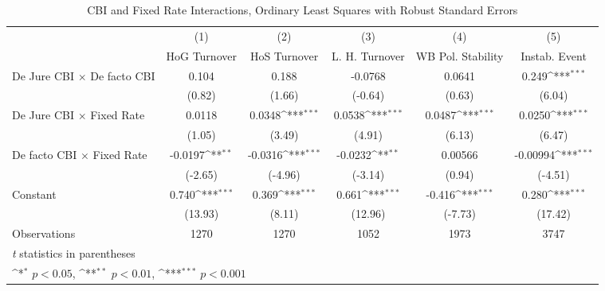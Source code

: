 \begin{table}[htbp]\centering
\def\sym#1{\ifmmode^{#1}\else\(^{#1}\)\fi}
\caption{CBI and Fixed Rate Interactions, Ordinary Least Squares with Robust Standard Errors \label{imultIndOLS}}
\begin{tabular}{l*{5}{c}}
\toprule
                                        &\multicolumn{1}{c}{(1)}&\multicolumn{1}{c}{(2)}&\multicolumn{1}{c}{(3)}&\multicolumn{1}{c}{(4)}&\multicolumn{1}{c}{(5)}\\
                                        &\multicolumn{1}{c}{HoG Turnover}&\multicolumn{1}{c}{HoS Turnover}&\multicolumn{1}{c}{L. H. Turnover}&\multicolumn{1}{c}{WB Pol. Stability}&\multicolumn{1}{c}{Instab. Event}\\
\midrule
De Jure CBI $\times$ De facto CBI       &    0.104         &    0.188         &  -0.0768         &   0.0641         &    0.249\sym{***}\\
                                        &   (0.82)         &   (1.66)         &  (-0.64)         &   (0.63)         &   (6.04)         \\
\addlinespace
De Jure CBI $\times$ Fixed Rate         &   0.0118         &   0.0348\sym{***}&   0.0538\sym{***}&   0.0487\sym{***}&   0.0250\sym{***}\\
                                        &   (1.05)         &   (3.49)         &   (4.91)         &   (6.13)         &   (6.47)         \\
\addlinespace
De facto CBI $\times$ Fixed Rate        &  -0.0197\sym{**} &  -0.0316\sym{***}&  -0.0232\sym{**} &  0.00566         & -0.00994\sym{***}\\
                                        &  (-2.65)         &  (-4.96)         &  (-3.14)         &   (0.94)         &  (-4.51)         \\
\addlinespace
Constant                                &    0.740\sym{***}&    0.369\sym{***}&    0.661\sym{***}&   -0.416\sym{***}&    0.280\sym{***}\\
                                        &  (13.93)         &   (8.11)         &  (12.96)         &  (-7.73)         &  (17.42)         \\
\midrule
Observations                            &     1270         &     1270         &     1052         &     1973         &     3747         \\
\bottomrule
\multicolumn{6}{l}{\footnotesize \textit{t} statistics in parentheses}\\
\multicolumn{6}{l}{\footnotesize \sym{*} \(p<0.05\), \sym{**} \(p<0.01\), \sym{***} \(p<0.001\)}\\
\end{tabular}
\end{table}
